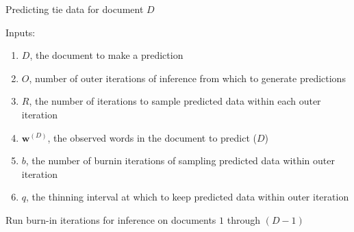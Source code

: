 \documentclass[a4paper]{article}
\begin{document}
        \begin{algorithm}[H]
        	\SetAlgoLined
        	\caption{Predicting tie data for document $D$}
       	Inputs:
       	\begin{enumerate}
       		\item $D$, the document to make a prediction
       		\item $O$, number of outer iterations of inference from which to generate predictions
       		\item $R$, the number of iterations to sample predicted data within each outer iteration
       		\item $\boldsymbol{w}^{(D)}$, the observed words in the document to predict ($D$)
       		\item $b$, the number of burnin iterations of sampling predicted data within outer iteration
       		\item $q$, the thinning interval at which to keep predicted data within outer iteration
       	\end{enumerate}
       	Run burn-in iterations for inference on documents $1$ through $(D-1)$\\
\end{algorithm}
\end{document}
